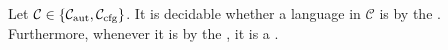 \begin{corollary}
    \label{aut-cfg-infix:cor}
    Let $\mathcal{C} \in \{  \mathcal{C}_\text{aut}, \mathcal{C}_{\text{cfg}} \}$.
    It is decidable whether a language in $\mathcal{C}$ is 
    by the .
    Furthermore, whenever it is  by the ,
    it is a .
\end{corollary}
